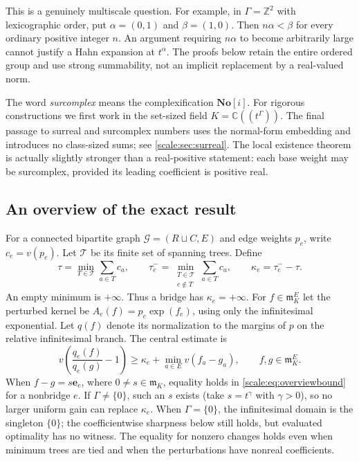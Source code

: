 \documentclass[11pt,a4paper]{article}
\numberwithin{equation}{section}
\theoremstyle{definition}
\newcommand{\C}{\mathbb C}
\newcommand{\Z}{\mathbb Z}
\newcommand{\No}{\mathbf{No}}
\newcommand{\mm}{\mathfrak m}
\newcommand{\GG}{\mathcal G}
\newcommand{\TT}{\mathcal T}
\begin{document}
This is a genuinely multiscale question. For example, in
$\Gamma=\Z^2$ with lexicographic order, put
$\alpha=(0,1)$ and $\beta=(1,0)$. Then $n\alpha<\beta$ for every
ordinary positive integer $n$. An argument requiring $n\alpha$ to
become arbitrarily large cannot justify a Hahn expansion at
$t^\alpha$. The proofs below retain the entire ordered group and use
strong summability, not an implicit replacement by a real-valued norm.

The word \emph{surcomplex} means the complexification $\No[i]$.
For rigorous constructions we first work in the set-sized field
$K=\C((t^\Gamma))$. The final passage to surreal and surcomplex numbers
uses the normal-form embedding and introduces no class-sized sums;
see \cref{scale:sec:surreal}. The local existence theorem is actually
slightly stronger than a real-positive statement: each base weight may
be surcomplex, provided its leading coefficient is positive real.

\subsection{An overview of the exact result}
For a connected bipartite graph $\GG=(R\sqcup C,E)$ and edge weights
$p_e$, write $c_e=v(p_e)$. Let $\TT$ be its finite set of spanning trees.
Define
\begin{equation}\label{scale:eq:overviewgap}
 \tau=\min_{T\in\TT}\sum_{a\in T}c_a,\qquad
 \tau_e^-=\min_{\substack{T\in\TT\\e\notin T}}\sum_{a\in T}c_a,
 \qquad \kappa_e=\tau_e^--\tau.
\end{equation}
An empty minimum is $+\infty$. Thus a bridge has $\kappa_e=+\infty$.
For $f\in\mm_K^E$ let the perturbed kernel be
$A_e(f)=p_e\exp(f_e)$, using only the infinitesimal exponential.
Let $q(f)$ denote its normalization to the margins of $p$ on the
relative infinitesimal branch. The central estimate is
\begin{equation}\label{scale:eq:overviewbound}
 v\!\left(\frac{q_e(f)}{q_e(g)}-1\right)
 \geq \kappa_e+\min_{a\in E}v(f_a-g_a),\qquad f,g\in\mm_K^E.
\end{equation}
When $f-g=s\mathbf e_e$, where $0\ne s\in\mm_K$, equality holds in
\eqref{scale:eq:overviewbound} for a nonbridge $e$. If $\Gamma\ne\{0\}$,
such an $s$ exists (take $s=t^\gamma$ with $\gamma>0$), so no larger
uniform gain can replace $\kappa_e$. When $\Gamma=\{0\}$, the
infinitesimal domain is the singleton $\{0\}$; the coefficientwise
sharpness below still holds, but evaluated optimality has no witness.
The equality for nonzero changes holds even when
minimum trees are tied and when the perturbations have nonreal
coefficients.
\end{document}
